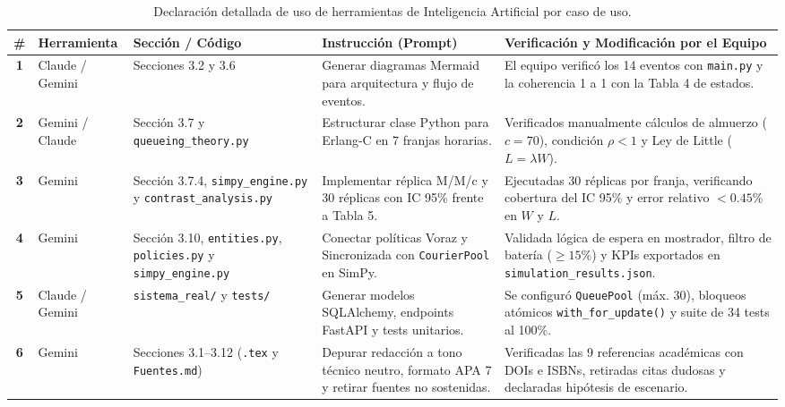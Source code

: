 \documentclass[11pt,letterpaper]{article}
\begin{document}
\begin{table}[htbp]
\centering
\small
\caption{Declaración detallada de uso de herramientas de Inteligencia Artificial por caso de uso.}
\begin{tabularx}{\textwidth}{c p{2.2cm} p{3.2cm} p{3.8cm} X}
\toprule
\textbf{\#} & \textbf{Herramienta} & \textbf{Sección / Código} & \textbf{Instrucción (Prompt)} & \textbf{Verificación y Modificación por el Equipo} \\
\midrule
\textbf{1} & Claude / Gemini & Secciones 3.2 y 3.6 & Generar diagramas Mermaid para arquitectura y flujo de eventos. & El equipo verificó los 14 eventos con \texttt{main.py} y la coherencia 1 a 1 con la Tabla 4 de estados. \\
\addlinespace
\textbf{2} & Gemini / Claude & Sección 3.7 y \texttt{queueing\_theory.py} & Estructurar clase Python para Erlang-C en 7 franjas horarias. & Verificados manualmente cálculos de almuerzo ($c=70$), condición $\rho < 1$ y Ley de Little ($L = \lambda W$). \\
\addlinespace
\textbf{3} & Gemini & Sección 3.7.4, \texttt{simpy\_engine.py} y \texttt{contrast\_analysis.py} & Implementar réplica M/M/c y 30 réplicas con IC 95\% frente a Tabla 5. & Ejecutadas 30 réplicas por franja, verificando cobertura del IC 95\% y error relativo $< 0.45\%$ en $W$ y $L$. \\
\addlinespace
\textbf{4} & Gemini & Sección 3.10, \texttt{entities.py}, \texttt{policies.py} y \texttt{simpy\_engine.py} & Conectar políticas Voraz y Sincronizada con \texttt{CourierPool} en SimPy. & Validada lógica de espera en mostrador, filtro de batería ($\ge 15\%$) y KPIs exportados en \texttt{simulation\_results.json}. \\
\addlinespace
\textbf{5} & Claude / Gemini & \texttt{sistema\_real/} y \texttt{tests/} & Generar modelos SQLAlchemy, endpoints FastAPI y tests unitarios. & Se configuró \texttt{QueuePool} (máx. 30), bloqueos atómicos \texttt{with\_for\_update()} y suite de 34 tests al 100\%. \\
\addlinespace
\textbf{6} & Gemini & Secciones 3.1–3.12 (\texttt{.tex} y \texttt{Fuentes.md}) & Depurar redacción a tono técnico neutro, formato APA 7 y retirar fuentes no sostenidas. & Verificadas las 9 referencias académicas con DOIs e ISBNs, retiradas citas dudosas y declaradas hipótesis de escenario. \\
\bottomrule
\end{tabularx}
\end{table}
\end{document}

